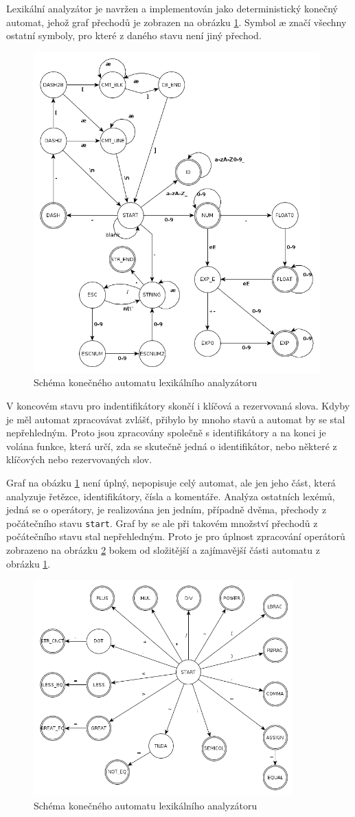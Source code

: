 Lexikální analyzátor je navržen a implementován jako deterministický ko\-neč\-ný automat, jehož graf přechodů je zobrazen na obrázku \ref{lex.lex}. Symbol \ae{} značí všechny ostatní symboly, pro které z daného stavu není jiný přechod.

\begin{figure}[h!]
\centering
\includegraphics[width=11cm]{lexical.png}
\caption{Schéma konečného automatu lexikálního analyzátoru}
\label{lex.lex}
\end{figure}

V koncovém stavu pro indentifikátory skončí i klíčová a rezervovaná slova. Kdyby je měl automat zpracovávat zvlášť, přibylo by mnoho stavů a automat by se stal nepřehledným. Proto jsou zpracovány společně s identifikátory a na konci je volána funkce, která určí, zda se skutečně jedná o identifikátor, nebo některé z klíčových nebo rezervovaných slov.

Graf na obázku \ref{lex.lex} není úplný, nepopisuje celý automat, ale jen jeho část, která analyzuje řetězce, identifikátory, čísla a komentáře. Analýza ostatních lexémů, jedná se o operátory, je realizována jen jedním, případně dvěma, přechody z počátečního stavu {\tt start}. Graf by se ale při takovém množství přechodů z počátečního stavu stal nepřehledným. Proto je pro úplnost zpracování operátorů zobrazeno na obrázku \ref{lex.ope} bokem od složitější a zajímavější části automatu z obrázku \ref{lex.lex}.

\begin{figure}
\centering
\includegraphics[width=10cm]{operator.png}
\caption{Schéma konečného automatu lexikálního analyzátoru}
\label{lex.ope}
\end{figure}
